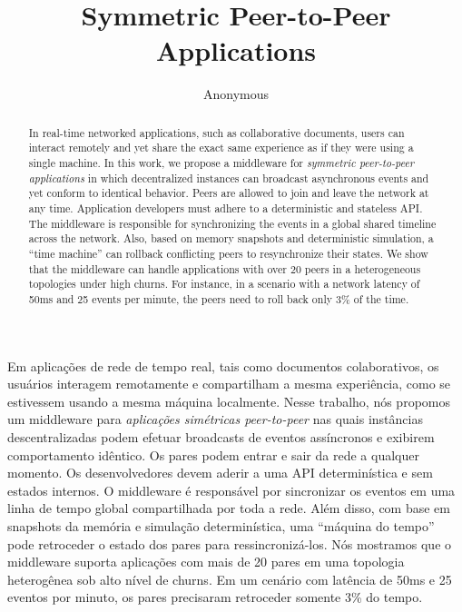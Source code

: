 \documentclass[12pt]{article}
\title{
    Symmetric Peer-to-Peer Applications
}
\author{Anonymous}
\begin{document}
\maketitle

\begin{abstract}
In real-time networked applications, such as collaborative documents, users can
interact remotely and yet share the exact same experience as if they were using
a single machine.
%
In this work, we propose a middleware for \emph{symmetric peer-to-peer
applications} in which decentralized instances can broadcast asynchronous
events and yet conform to identical behavior.
%
Peers are allowed to join and leave the network at any time.
Application developers must adhere to a deterministic and stateless API.
%
The middleware is responsible for synchronizing the events in a global shared
timeline across the network.
Also, based on memory snapshots and deterministic simulation, a ``time machine''
can rollback conflicting peers to resynchronize their states.
%
We show that the middleware can handle applications with over 20 peers in a
heterogeneous topologies under high churns.
For instance, in a scenario with a network latency of 50ms and 25 events per
minute, the peers need to roll back only 3\% of the time.
\end{abstract}

\begin{resumo} 
Em aplicações de rede de tempo real, tais como documentos colaborativos, os
usuários interagem remotamente e compartilham a mesma experiência, como se
estivessem usando a mesma máquina localmente.
%
Nesse trabalho, nós propomos um middleware para \emph{aplicações simétricas
peer-to-peer} nas quais instâncias descentralizadas podem efetuar broadcasts de
eventos assíncronos e exibirem comportamento idêntico.
%
Os pares podem entrar e sair da rede a qualquer momento.
Os desenvolvedores devem aderir a uma API determinística e sem estados
internos.
%
O middleware é responsável por sincronizar os eventos em uma linha de tempo
global compartilhada por toda a rede.
Além disso, com base em snapshots da memória e simulação determinística, uma
``máquina do tempo'' pode retroceder o estado dos pares para ressincronizá-los.
%
Nós mostramos que o middleware suporta aplicações com mais de 20 pares em uma
topologia heterogênea sob alto nível de churns.
Em um cenário com latência de 50ms e 25 eventos por minuto, os pares precisaram
retroceder somente 3\% do tempo.
\end{resumo}
\end{document}
